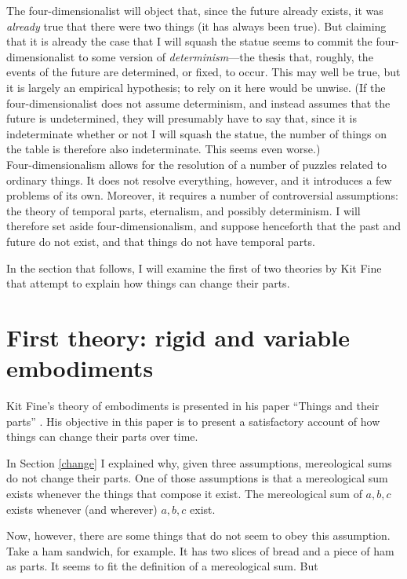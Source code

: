 \documentclass[11pt]{article}
\begin{document}
\begin{spacing}{1.5}
The four-dimensionalist will object that, since the future already
exists, it was {\em already} true that there were two things (it has
always been true).  But claiming that it is already the case that I
will squash the statue seems to commit the four-dimensionalist to some
version of {\em determinism}---the thesis that, roughly, the events of
the future are determined, or fixed, to occur.  This may well be true,
but it is largely an empirical hypothesis; to rely on it here would be
unwise.  (If the four-dimensionalist does not assume determinism, and
instead assumes that the future is undetermined, they will presumably
have to say that, since it is indeterminate whether or not I will
squash the statue, the number of things on the table is therefore also
indeterminate.  This seems even worse.)\\

Four-dimensionalism allows for the resolution of a number of puzzles
related to ordinary things.  It does not resolve everything, however,
and it introduces a few problems of its own.  Moreover, it requires a
number of controversial assumptions: the theory of temporal parts,
eternalism, and possibly determinism.  I will therefore set aside
four-dimensionalism, and suppose henceforth that the past and future
do not exist, and that things do not have temporal parts.

In the section that follows, I will examine the first of two theories
by Kit Fine that attempt to explain how things can change their parts.

\section{First theory: rigid and variable embodiments}
\label{fine-h}
Kit Fine's theory of embodiments is presented in his paper ``Things
and their parts'' \citeyearpar{fine1999}.  His objective in this paper
is to present a satisfactory account of how things can change their
parts over time.

In Section \ref{change} I explained why, given three assumptions,
mereological sums do not change their parts.  One of those assumptions
is that a mereological sum exists whenever the things that compose it
exist.  The mereological sum of $a, b, c$ exists whenever (and
wherever) $a, b, c$ exist.

Now, however, there are some things that do not seem to obey this
assumption.  Take a ham sandwich, for example.  It has two slices of
bread and a piece of ham as parts.  It seems to fit the definition of
a mereological sum.  But


\end{spacing}
\end{document}
